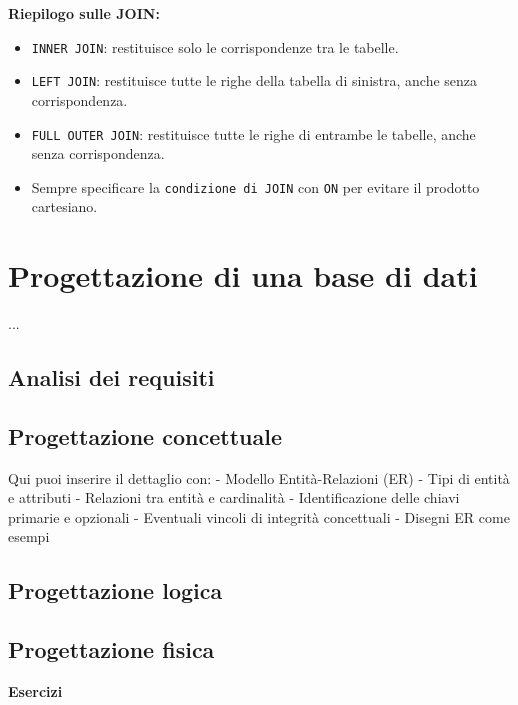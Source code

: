 \documentclass[a4paper,12pt]{article}
\newcommand{\code}[1]{\texttt{#1}}
\begin{document}
\bigskip
\textbf{Riepilogo sulle JOIN:}
\begin{itemize}
    \item \code{INNER JOIN}: restituisce solo le corrispondenze tra le tabelle.
    \item \code{LEFT JOIN}: restituisce tutte le righe della tabella di sinistra, anche senza corrispondenza.
    \item \code{FULL OUTER JOIN}: restituisce tutte le righe di entrambe le tabelle, anche senza corrispondenza.
    \item Sempre specificare la \code{condizione di JOIN} con \code{ON} per evitare il prodotto cartesiano.
\end{itemize}












\newpage
\section{Progettazione di una base di dati}
  ...
  \subsection{Analisi dei requisiti}
  \subsection{Progettazione concettuale}
      Qui puoi inserire il dettaglio con:
      - Modello Entità-Relazioni (ER)
      - Tipi di entità e attributi
      - Relazioni tra entità e cardinalità
      - Identificazione delle chiavi primarie e opzionali
      - Eventuali vincoli di integrità concettuali
      - Disegni ER come esempi
  \subsection{Progettazione logica}
  \subsection{Progettazione fisica}

\newpage

\thispagestyle{empty}
\begin{center}
    \vspace*{5cm}
    {\Huge\bfseries Esercizi}
\end{center}
\newpage
\end{document}
